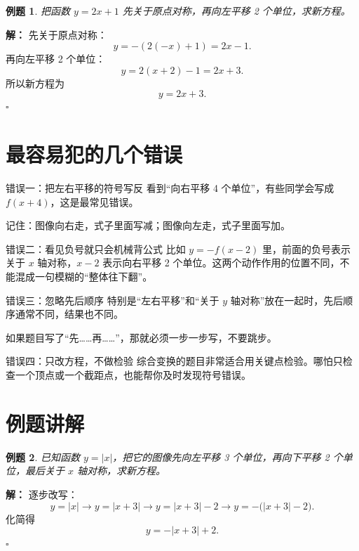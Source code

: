 \documentclass[11pt,a4paper,fontset=fandol]{ctexart}
\theoremstyle{formaltheorem}
\theoremstyle{formalexample}
\newtheorem{example}{例题}[section]
\newenvironment{solution}{\par\noindent\textbf{解：}}{\hfill$\square$\par}
\begin{document}
\begin{example}
把函数 \(y=2x+1\) 先关于原点对称，再向左平移 2 个单位，求新方程。
\end{example}

\begin{solution}
先关于原点对称：
\[
y=-(2(-x)+1)=2x-1.
\]
再向左平移 2 个单位：
\[
y=2(x+2)-1=2x+3.
\]
所以新方程为
\[
y=2x+3.
\]
\end{solution}

\section{最容易犯的几个错误}

\begin{notebox}{错误一：把左右平移的符号写反}
看到“向右平移 4 个单位”，有些同学会写成 \(f(x+4)\)，这是最常见错误。

记住：图像向右走，式子里面写减；图像向左走，式子里面写加。
\end{notebox}

\begin{notebox}{错误二：看见负号就只会机械背公式}
比如 \(y=-f(x-2)\) 里，前面的负号表示关于 \(x\) 轴对称，\(x-2\) 表示向右平移 2 个单位。这两个动作作用的位置不同，不能混成一句模糊的“整体往下翻”。
\end{notebox}

\begin{notebox}{错误三：忽略先后顺序}
特别是“左右平移”和“关于 \(y\) 轴对称”放在一起时，先后顺序通常不同，结果也不同。

如果题目写了“先……再……”，那就必须一步一步写，不要跳步。
\end{notebox}

\begin{notebox}{错误四：只改方程，不做检验}
综合变换的题目非常适合用关键点检验。哪怕只检查一个顶点或一个截距点，也能帮你及时发现符号错误。
\end{notebox}

\section{例题讲解}

\begin{example}
已知函数 \(y=|x|\)，把它的图像先向左平移 3 个单位，再向下平移 2 个单位，最后关于 \(x\) 轴对称，求新方程。
\end{example}

\begin{solution}
逐步改写：
\[
y=|x| \rightarrow y=|x+3| \rightarrow y=|x+3|-2 \rightarrow y=-\bigl(|x+3|-2\bigr).
\]
化简得
\[
y=-|x+3|+2.
\]
\end{solution}
\end{document}
